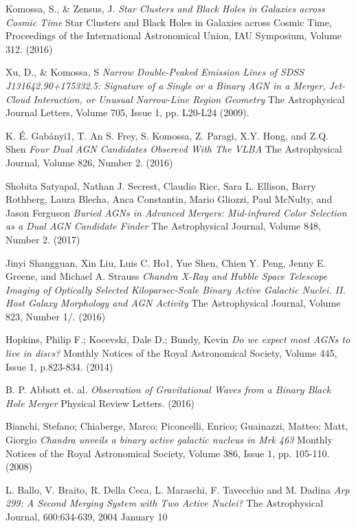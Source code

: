 \documentclass[12pt]{article}
\begin{document}
\begin{thebibliography}{9}
Komossa, S., & Zensus, J.
\textit{Star Clusters and Black Holes in Galaxies across Cosmic Time}
Star Clusters and Black Holes in Galaxies across Cosmic Time, Proceedings of the International Astronomical Union, IAU Symposium, Volume 312. (2016)

Xu, D., & Komossa, S
\textit{Narrow Double-Peaked Emission Lines of SDSS J131642.90+175332.5: Signature of a Single or a Binary AGN in a Merger, Jet-Cloud Interaction, or Unusual Narrow-Line Region Geometry}
The Astrophysical Journal Letters, Volume 705, Issue 1, pp. L20-L24 (2009). 

K. É. Gabányi1, T. An S. Frey, S. Komossa, Z. Paragi, X.Y. Hong, and Z.Q. Shen
\textit{Four Dual AGN Candidates Obserevd With The VLBA}
The Astrophysical Journal, Volume 826, Number 2. (2016)

Shobita Satyapal, Nathan J. Secrest, Claudio Ricc, Sara L. Ellison, Barry Rothberg, Laura Blecha, Anca Constantin, Mario Gliozzi, Paul McNulty, and Jason Ferguson
\textit{Buried AGNs in Advanced Mergers: Mid-infrared Color Selection as a Dual AGN
Candidate Finder}
The Astrophysical Journal, Volume 848, Number 2. (2017)

Jinyi Shangguan, Xin Liu, Luis C. Ho1, Yue Shen, Chien Y. Peng, Jenny E. Greene, and Michael A. Strauss
\textit{Chandra X-Ray and Hubble Space Telescope Imaging of Optically Selected Kiloparsec-Scale Binary Active Galactic Nuclei. II. Host Galaxy Morphology and AGN Activity}
The Astrophysical Journal, Volume 823, Number 1/. (2016)

Hopkins, Philip F.; Kocevski, Dale D.; Bundy, Kevin
\textit{Do we expect most AGNs to live in discs?}
Monthly Notices of the Royal Astronomical Society, Volume 445, Issue 1, p.823-834. (2014)

B. P. Abbott et. al.
\textit{Observation of Gravitational Waves from a Binary Black Hole Merger}
Physical Review Letters. (2016)

Bianchi, Stefano; Chiaberge, Marco; Piconcelli, Enrico; Guainazzi, Matteo; Matt, Giorgio
\textit{Chandra unveils a binary active galactic nucleus in Mrk 463}
Monthly Notices of the Royal Astronomical Society, Volume 386, Issue 1, pp. 105-110. (2008)

L. Ballo, V. Braito, R. Della Ceca, L. Maraschi, F. Tavecchio and M. Dadina
\textit{Arp 299: A Second Merging System with Two Active Nuclei?}
The Astrophysical Journal, 600:634-639, 2004 January 10


\end{thebibliography}
\end{document}
